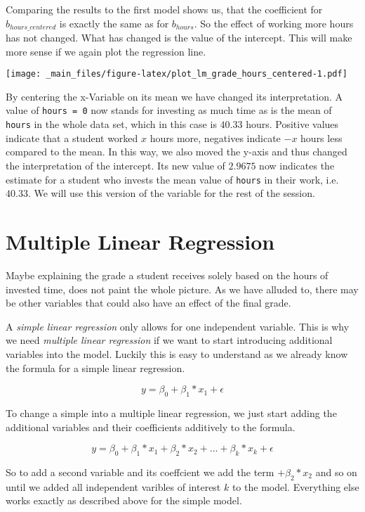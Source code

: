 \documentclass[
]{book}
\begin{document}
Comparing the results to the first model shows us, that the coefficient for
\(b_{hours\_centered}\) is exactly the same as for \(b_{hours}\). So the effect
of working more hours has not changed. What has changed is the value of the
intercept. This will make more sense if we again plot the regression line.

\texttt{[image: \_main\_files/figure-latex/plot\_lm\_grade\_hours\_centered-1.pdf]}

By centering the x-Variable on its mean we have changed its interpretation.
A value of \texttt{hours\ =\ 0} now stands for investing as much time as is the mean
of \texttt{hours} in the whole data set, which in this case is \(40.33\) hours. Positive
values indicate that a student worked \(x\) hours more, negatives indicate \(-x\)
hours less compared to the mean. In this way, we also moved the y-axis and thus
changed the interpretation of the intercept. Its new value of \(2.9675\) now
indicates the estimate for a student who invests the mean value of \texttt{hours} in
their work, i.e.~\(40.33\). We will use this version of the variable for the rest
of the session.

\hypertarget{multiple-linear-regression}{%
\section{Multiple Linear Regression}\label{multiple-linear-regression}}

Maybe explaining the grade a student receives solely based on the hours of
invested time, does not paint the whole picture. As we have alluded to, there
may be other variables that could also have an effect of the final grade.

A \emph{simple linear regression} only allows for one independent variable. This is
why we need \emph{multiple linear regression} if we want to start introducing
additional variables into the model. Luckily this is easy to understand as we
already know the formula for a simple linear regression.

\[y = \beta_0 + \beta_1*x_1 + \epsilon\]

To change a simple into a multiple linear regression, we just start adding the
additional variables and their coefficients additively to the formula.

\[y = \beta_0 + \beta_1*x_1 + \beta_2*x_2 + ... + \beta_k*x_k + \epsilon\]

So to add a second variable and its coeffcient we add the term \(+ \beta_2*x_2\)
and so on until we added all independent varibles of interest \(k\) to the model.
Everything else works exactly as described above for the simple model.
\end{document}
